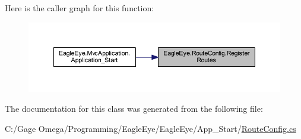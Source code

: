 Here is the caller graph for this function\+:\nopagebreak
\begin{figure}[H]
\begin{center}
\leavevmode
\includegraphics[width=350pt]{class_eagle_eye_1_1_route_config_a7db021b23f5a50303ade8309b5a63afb_icgraph}
\end{center}
\end{figure}


The documentation for this class was generated from the following file\+:\begin{DoxyCompactItemize}
\item 
C\+:/\+Gage Omega/\+Programming/\+Eagle\+Eye/\+Eagle\+Eye/\+App\+\_\+\+Start/\mbox{\hyperlink{_route_config_8cs}{Route\+Config.\+cs}}\end{DoxyCompactItemize}
